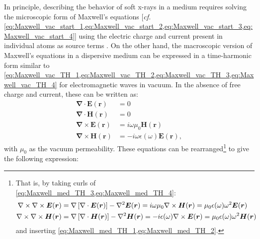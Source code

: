 In principle, describing the behavior of soft x-rays in a medium requires solving the microscopic form of Maxwell's equations [\emph{cf.\@} \cref{eq:Maxwell_vac_start_1,eq:Maxwell_vac_start_2,eq:Maxwell_vac_start_3,eq:Maxwell_vac_start_4}] using the electric charge and current present in individual atoms as source terms \cite{Attwood17,deBergevin09}. 
On the other hand, the macroscopic version of Maxwell's equations in a dispersive medium can be expressed in a time-harmonic form similar to \cref{eq:Maxwell_vac_TH_1,eq:Maxwell_vac_TH_2,eq:Maxwell_vac_TH_3,eq:Maxwell_vac_TH_4} for electromagnetic waves in vacuum. 
In the absence of free charge and current, these can be written as:
\begin{subequations}
\begin{align} 
 \mathbold{\nabla} \cdot \mathbold{E} \left( \mathbold{r} \right) &= 0 \label{eq:Maxwell_med_TH_1} \\
 \mathbold{\nabla} \cdot \mathbold{H} \left( \mathbold{r} \right) &= 0 \label{eq:Maxwell_med_TH_2} \\
 \mathbold{\nabla} \times \mathbold{E} \left( \mathbold{r} \right) &= i \omega \mu_0 \mathbold{H} \left( \mathbold{r} \right) \label{eq:Maxwell_med_TH_3} \\
 \mathbold{\nabla} \times \mathbold{H} \left( \mathbold{r} \right) &= -i \omega \epsilon (\omega) \mathbold{E} \left( \mathbold{r} \right) \label{eq:Maxwell_med_TH_4} ,
 \end{align}
\end{subequations}
with $\mu_0$ as the vacuum permeability. 
These equations can be rearranged\footnote{That is, by taking curls of \cref{eq:Maxwell_med_TH_3,eq:Maxwell_med_TH_4}: 
\begin{align*}
 \begin{split}
 \mathbold{\nabla} \times \mathbold{\nabla} \times \mathbold{E}(\mathbold{r}) &= \mathbold{\nabla}\left[\mathbold{\nabla} \cdot \mathbold{E}(\mathbold{r})\right] - \laplacian \mathbold{E}(\mathbold{r}) = i \omega \mu_0 \mathbold{\nabla} \times \mathbold{H} (\mathbold{r}) = \mu_0 \epsilon (\omega) \omega^2 \mathbold{E} (\mathbold{r}) \\
 \mathbold{\nabla} \times \mathbold{\nabla} \times \mathbold{H}(\mathbold{r}) &= \mathbold{\nabla}\left[\mathbold{\nabla} \cdot \mathbold{H}(\mathbold{r})\right] - \laplacian \mathbold{H}(\mathbold{r}) = - i \epsilon (\omega) \mathbold{\nabla} \times \mathbold{E} (\mathbold{r}) = \mu_0 \epsilon (\omega) \omega^2 \mathbold{H} (\mathbold{r})
 \end{split}
 \end{align*}
and inserting \cref{eq:Maxwell_med_TH_1,eq:Maxwell_med_TH_2}.} to give the following expression: 
